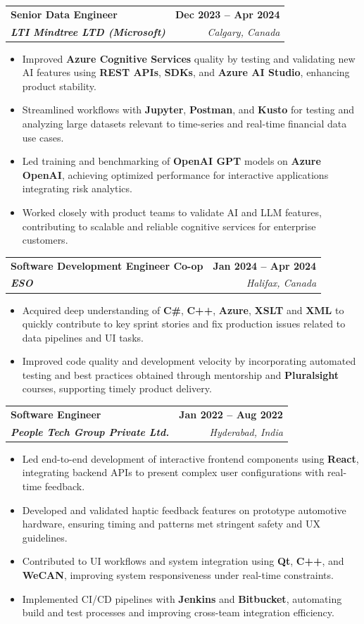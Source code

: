 \documentclass[letterpaper,11pt]{article}
\makeatletter
\newcommand{\resumeItem}[1]{
  \item\small{
    {#1 \vspace{-2pt}}
  }
}
\newcommand{\resumeSubheading}[4]{
  \vspace{-2pt}\item
    \begin{tabular*}{1.0\textwidth}[t]{l@{\extracolsep{\fill}}r}
      \textbf{#1} & \textbf{\small #2} \\
      \textit{\small#3} & \textit{\small #4} \\
    \end{tabular*}\vspace{-7pt}
}
\newcommand{\resumeItemListStart}{\begin{itemize}}
\newcommand{\resumeItemListEnd}{\end{itemize}\vspace{-5pt}}
\makeatother
\begin{document}
    \resumeSubheading
      {\textbf{Senior Data Engineer}}{\textbf{Dec 2023 -- Apr 2024}}
      {\textbf{LTI Mindtree LTD (Microsoft)}}{Calgary, Canada}
      \resumeItemListStart
        \resumeItem{Improved \textbf{Azure Cognitive Services} quality by testing and validating new AI features using \textbf{REST APIs}, \textbf{SDKs}, and \textbf{Azure AI Studio}, enhancing product stability.}
        \resumeItem{Streamlined workflows with \textbf{Jupyter}, \textbf{Postman}, and \textbf{Kusto} for testing and analyzing large datasets relevant to time-series and real-time financial data use cases.}
        \resumeItem{Led training and benchmarking of \textbf{OpenAI GPT} models on \textbf{Azure OpenAI}, achieving optimized performance for interactive applications integrating risk analytics.}
        \resumeItem{Worked closely with product teams to validate AI and LLM features, contributing to scalable and reliable cognitive services for enterprise customers.}
      \resumeItemListEnd
    
    \resumeSubheading
      {\textbf{Software Development Engineer Co-op}}{\textbf{Jan 2024 -- Apr 2024}}
      {\textbf{ESO}}{Halifax, Canada}
      \resumeItemListStart
        \resumeItem{Acquired deep understanding of \textbf{C\#}, \textbf{C++}, \textbf{Azure}, \textbf{XSLT} and \textbf{XML} to quickly contribute to key sprint stories and fix production issues related to data pipelines and UI tasks.}
        \resumeItem{Improved code quality and development velocity by incorporating automated testing and best practices obtained through mentorship and \textbf{Pluralsight} courses, supporting timely product delivery.}
      \resumeItemListEnd

    \resumeSubheading
      {\textbf{Software Engineer}}{\textbf{Jan 2022 -- Aug 2022}}
      {\textbf{People Tech Group Private Ltd.}}{Hyderabad, India}
      \resumeItemListStart
        \resumeItem{Led end-to-end development of interactive frontend components using \textbf{React}, integrating backend APIs to present complex user configurations with real-time feedback.}
        \resumeItem{Developed and validated haptic feedback features on prototype automotive hardware, ensuring timing and patterns met stringent safety and UX guidelines.}
        \resumeItem{Contributed to UI workflows and system integration using \textbf{Qt}, \textbf{C++}, and \textbf{WeCAN}, improving system responsiveness under real-time constraints.}
        \resumeItem{Implemented CI/CD pipelines with \textbf{Jenkins} and \textbf{Bitbucket}, automating build and test processes and improving cross-team integration efficiency.}
      \resumeItemListEnd
\end{document}
